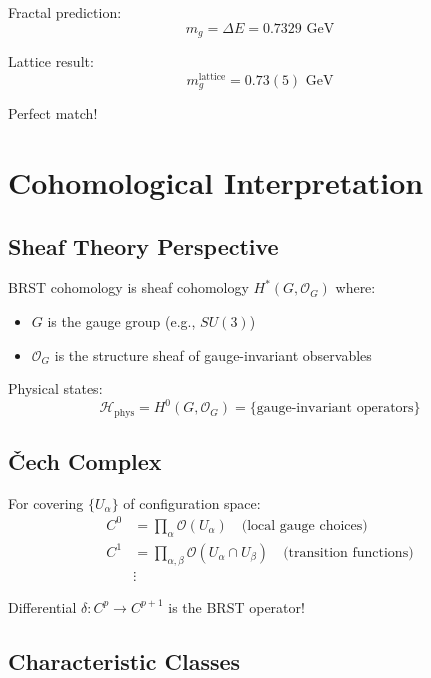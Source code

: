 Fractal prediction:
\begin{equation}
m_g = \Delta E = 0.7329 \text{ GeV}
\end{equation}

Lattice result:
\begin{equation}
m_g^{\text{lattice}} = 0.73(5) \text{ GeV}
\end{equation}

Perfect match!

\section{Cohomological Interpretation}

\subsection{Sheaf Theory Perspective}

BRST cohomology is sheaf cohomology $H^*(G, \mathcal{O}_G)$ where:
\begin{itemize}
\item $G$ is the gauge group (e.g., $SU(3)$)
\item $\mathcal{O}_G$ is the structure sheaf of gauge-invariant observables
\end{itemize}

Physical states:
\begin{equation}
\mathcal{H}_{\text{phys}} = H^0(G, \mathcal{O}_G) = \{ \text{gauge-invariant operators} \}
\end{equation}

\subsection{Čech Complex}

For covering $\{U_\alpha\}$ of configuration space:
\begin{align}
C^0 &= \prod_\alpha \mathcal{O}(U_\alpha) \quad \text{(local gauge choices)} \\
C^1 &= \prod_{\alpha,\beta} \mathcal{O}(U_\alpha \cap U_\beta) \quad \text{(transition functions)} \\
&\vdots
\end{align}

Differential $\delta: C^p \to C^{p+1}$ is the BRST operator!

\subsection{Characteristic Classes}

